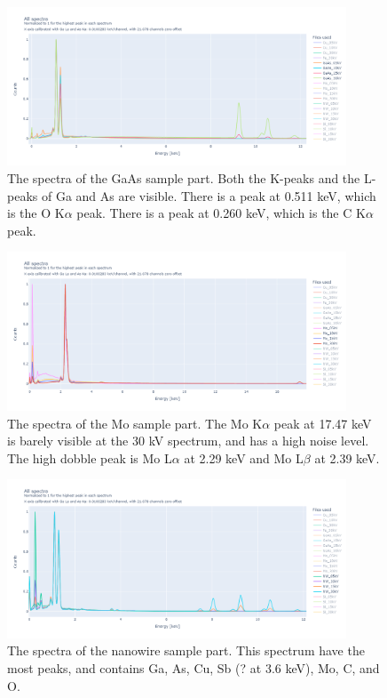 \begin{figure}
    \centering
    \includegraphics[width=0.90\textwidth]{figures/Spectra_GaAs.png}
    \caption{
        The spectra of the GaAs sample part.
        Both the K-peaks and the L-peaks of Ga and As are visible.
        There is a peak at 0.511 keV, which is the O K$\alpha$ peak.
        There is a peak at 0.260 keV, which is the C K$\alpha$ peak.
    }
    \label{fig:results:Spectra_GaAs}
\end{figure}

\begin{figure}
    \centering
    \includegraphics[width=0.90\textwidth]{figures/Spectra_Mo.png}
    \caption{
        The spectra of the Mo sample part.
        The Mo K$\alpha$ peak at 17.47 keV is barely visible at the 30 kV spectrum, and has a high noise level.
        The high dobble peak is Mo L$\alpha$ at 2.29 keV and Mo L$\beta$ at 2.39 keV.
    }
    \label{fig:results:Spectra_Mo}
\end{figure}

\begin{figure}
    \centering
    \includegraphics[width=0.90\textwidth]{figures/Spectra_NW.png}
    \caption{
        The spectra of the nanowire sample part.
        This spectrum have the most peaks, and contains Ga, As, Cu, Sb (? at 3.6 keV), Mo, C, and O.
    }
    \label{fig:results:Spectra_NW}
\end{figure}

